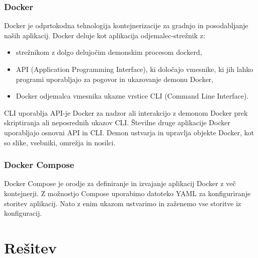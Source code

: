 \documentclass[a4paper,12pt,openright]{book}
\begin{document}
\subsection{Docker}
Docker\cite{dockerLink} je odprtokodna tehnologija kontejnerizacije za gradnjo in posodabljanje naših aplikacij.
Docker deluje kot aplikacija odjemalec-strežnik z:
\begin{itemize}
    \item strežnikom z dolgo delujočim demonskim procesom dockerd,
    \item API (Application Programming Interface), ki določajo vmesnike, ki jih lahko programi uporabljajo za pogovor in ukazovanje demonu Docker,
    \item Docker odjemalca vmesnika ukazne vrstice CLI (Command Line Interface).
\end{itemize}
CLI uporablja API-je Docker za nadzor ali interakcijo z demonom Docker prek skriptiranja ali neposrednih ukazov CLI. Številne druge aplikacije Docker uporabljajo osnovni API in CLI. Demon ustvarja in upravlja objekte Docker, kot so slike, vsebniki, omrežja in nosilci.

\subsection{Docker Compose}
\label{Docker}
Docker Compose\cite{dockerComposeLink} je orodje za definiranje in izvajanje aplikacij Docker z več kontejnerji. Z možnostjo Compose uporabimo datoteko YAML za konfiguriranje storitev aplikacij. Nato z enim ukazom ustvarimo in zaženemo vse storitve iz konfiguracij.

\chapter{Rešitev}
\end{document}
